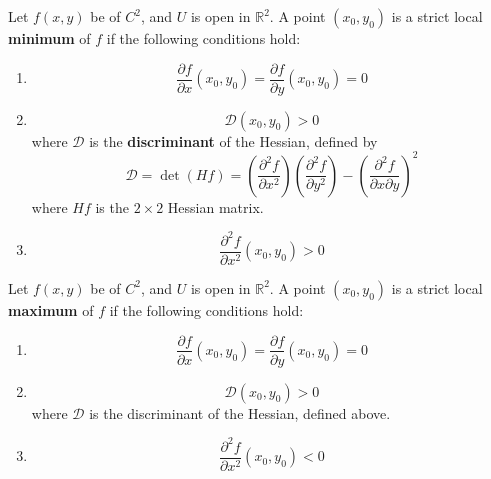 \documentclass[openany]{book}
\newcommand{\R}{\mathbb{R}}
\begin{document}
\begin{prop}
    Let $f(x,y)$ be of $C^2$, and $U$ is open in $\R^2$. A point $(x_0,y_0)$ is a strict local \textbf{minimum} of $f$ if the following conditions hold:
    \begin{enumerate}
        \item \begin{equation*}
            \frac{\partial f}{\partial x}(x_0,y_0)=\frac{\partial f}{\partial y}(x_0,y_0)=0
        \end{equation*}
        \item \begin{equation*}
            \mathcal{D}(x_0,y_0)>0
        \end{equation*}
        where $\mathcal{D}$ is the \textbf{discriminant} of the Hessian, defined by 
        \begin{equation*}
            \mathcal{D}=\det (Hf)=\left(\frac{\partial^2 f}{\partial x^2}\right)\left(\frac{\partial^2 f}{\partial y^2}\right)-\left(\frac{\partial^2 f}{\partial x\partial y}\right)^2
        \end{equation*}
        where $Hf$ is the $2\times 2$ Hessian matrix.
        \item  \begin{equation*}
            \frac{\partial^2f}{\partial x^2}(x_0,y_0)>0
        \end{equation*}
    \end{enumerate}
\end{prop}


\begin{prop}
    Let $f(x,y)$ be of $C^2$, and $U$ is open in $\R^2$. A point $(x_0,y_0)$ is a strict local \textbf{maximum} of $f$ if the following conditions hold:
    \begin{enumerate}
        \item \begin{equation*}
            \frac{\partial f}{\partial x}(x_0,y_0)=\frac{\partial f}{\partial y}(x_0,y_0)=0
        \end{equation*}
        \item \begin{equation*}
            \mathcal{D}(x_0,y_0)>0
        \end{equation*}
        where $\mathcal{D}$ is the {discriminant} of the Hessian, defined above.
        \item  \begin{equation*}
            \frac{\partial^2f}{\partial x^2}(x_0,y_0)<0
        \end{equation*}
    \end{enumerate}
\end{prop}
\end{document}
